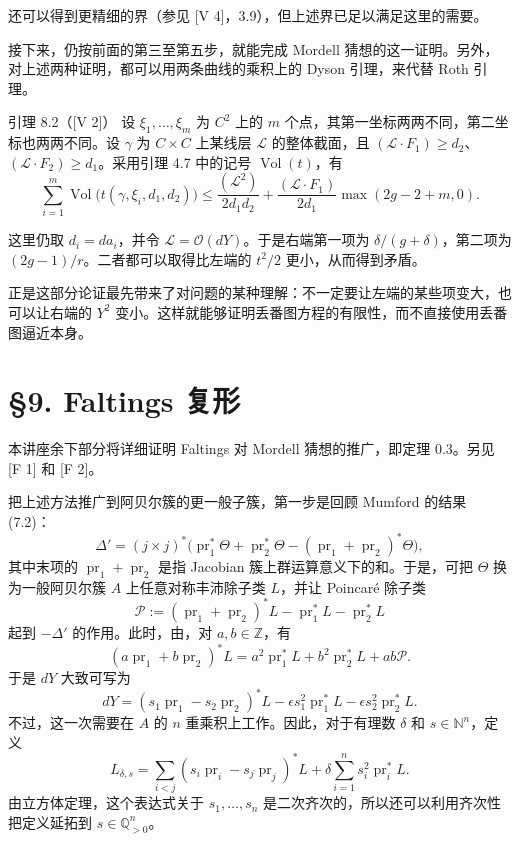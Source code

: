 还可以得到更精细的界（参见 [V 4]，3.9），但上述界已足以满足这里的需要。

接下来，仍按前面的第三至第五步，就能完成 Mordell 猜想的这一证明。另外，对上述两种证明，都可以用两条曲线的乘积上的 Dyson 引理，来代替 Roth 引理。
\begin{statement}{引理 8.2（[V 2]）}
设 $\xi_1,\ldots,\xi_m$ 为 $C^2$ 上的 $m$ 个点，其第一坐标两两不同，第二坐标也两两不同。设 $\gamma$ 为 $C\times C$ 上某线层 $\mathscr L$ 的整体截面，且 $(\mathscr L\cdot F_1)\ge d_2$、$(\mathscr L\cdot F_2)\ge d_1$。采用引理 4.7 中的记号 $\operatorname{Vol}(t)$，有
\[
\sum_{i=1}^m\operatorname{Vol}\bigl(t(\gamma,\xi_i,d_1,d_2)\bigr)
\le\frac{(\mathscr L^2)}{2d_1d_2}
+\frac{(\mathscr L\cdot F_1)}{2d_1}\max(2g-2+m,0).
\]
\end{statement}
这里仍取 $d_i=da_i$，并令 $\mathscr L=\mathcal O(dY)$。于是右端第一项为 $\delta/(g+\delta)$，第二项为 $(2g-1)/r$。二者都可以取得比左端的 $t^2/2$ 更小，从而得到矛盾。

正是这部分论证最先带来了对问题的某种理解：不一定要让左端的某些项变大，也可以让右端的 $Y^2$ 变小。这样就能够证明丢番图方程的有限性，而不直接使用丢番图逼近本身。

\section*{§9. Faltings 复形}
本讲座余下部分将详细证明 Faltings 对 Mordell 猜想的推广，即定理 0.3。另见 [F 1] 和 [F 2]。

把上述方法推广到阿贝尔簇的更一般子簇，第一步是回顾 Mumford 的结果 (7.2)：
\[
\Delta'=(j\times j)^*\bigl(\operatorname{pr}_1^*\Theta
+\operatorname{pr}_2^*\Theta-(\operatorname{pr}_1+\operatorname{pr}_2)^*\Theta\bigr),
\]
其中末项的 $\operatorname{pr}_1+\operatorname{pr}_2$ 是指 Jacobian 簇上群运算意义下的和。于是，可把 $\Theta$ 换为一般阿贝尔簇 $A$ 上任意对称丰沛除子类 $L$，并让 Poincaré 除子类
\[
\mathscr P:=(\operatorname{pr}_1+\operatorname{pr}_2)^*L
-\operatorname{pr}_1^*L-\operatorname{pr}_2^*L
\]
起到 $-\Delta'$ 的作用。此时，由，对 $a,b\in\mathbb Z$，有
\begin{equation*}
(a\operatorname{pr}_1+b\operatorname{pr}_2)^*L
=a^2\operatorname{pr}_1^*L+b^2\operatorname{pr}_2^*L+ab\mathscr P.\tag{9.1}
\end{equation*}
于是 $dY$ 大致可写为
\[
dY=(s_1\operatorname{pr}_1-s_2\operatorname{pr}_2)^*L
-\epsilon s_1^2\operatorname{pr}_1^*L-\epsilon s_2^2\operatorname{pr}_2^*L.
\]
不过，这一次需要在 $A$ 的 $n$ 重乘积上工作。因此，对于有理数 $\delta$ 和 $s\in\mathbb N^n$，定义
\begin{equation*}
L_{\delta,s}=\sum_{i<j}(s_i\operatorname{pr}_i-s_j\operatorname{pr}_j)^*L
+\delta\sum_{i=1}^n s_i^2\operatorname{pr}_i^*L.\tag{9.2}
\end{equation*}
由立方体定理，这个表达式关于 $s_1,\ldots,s_n$ 是二次齐次的，所以还可以利用齐次性把定义延拓到 $s\in\mathbb Q_{>0}^n$。

